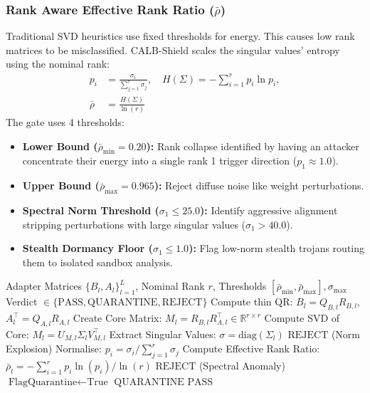 \documentclass[conference]{IEEEtran}
\begin{document}
\subsubsection{Rank Aware Effective Rank Ratio \texorpdfstring{($\bar{\rho}$)}{(rho)}}
Traditional SVD heuristics use fixed thresholds for energy. This causes low rank matrices to be misclassified. CALB-Shield scales the singular values' entropy using the nominal rank:
\begin{align}
p_i &= \frac{\sigma_i}{\sum_{j=1}^r \sigma_j}, \quad H(\Sigma) = -\sum_{i=1}^r p_i \ln p_i, \nonumber \\
\bar{\rho} &= \frac{H(\Sigma)}{\ln(r)}
\end{align}
The gate uses 4 thresholds:
\begin{itemize}
    \item \textbf{Lower Bound ($\bar{\rho}_{\min} = 0.20$):} Rank collapse identified by having an attacker concentrate their energy into a single rank 1 trigger direction ($p_1 \approx 1.0$).
    \item \textbf{Upper Bound ($\bar{\rho}_{\max} = 0.965$):} Reject diffuse noise like weight perturbations.
    \item \textbf{Spectral Norm Threshold ($\sigma_1 \le 25.0$):} Identify aggressive alignment stripping perturbations with large singular values ($\sigma_1 > 40.0$).
    \item \textbf{Stealth Dormancy Floor ($\sigma_1 \le 1.0$):} Flag low-norm stealth trojans routing them to isolated sandbox analysis.
\end{itemize}

\begin{algorithm}[t]
\caption{Fast QR-SVD Spectral Check and Rank Bounds}
\label{alg:qr_svd}
\begin{algorithmic}[1]
\REQUIRE Adapter Matrices $\{B_l, A_l\}_{l=1}^L$, Nominal Rank $r$, Thresholds $[\bar{\rho}_{\min}, \bar{\rho}_{\max}], \sigma_{\max}$
\ENSURE Verdict $\in \{\text{PASS}, \text{QUARANTINE}, \text{REJECT}\}$
    \STATE Compute thin QR: $B_l = Q_{B,l} R_{B,l}$, $A_l^\top = Q_{A,l} R_{A,l}$
    \STATE Create Core Matrix: $M_l = R_{B,l} R_{A,l}^\top \in \mathbb{R}^{r \times r}$
    \STATE Compute SVD of Core: $M_l = U_{M,l} \Sigma_l V_{M,l}^\top$
    \STATE Extract Singular Values: $\sigma = \text{diag}(\Sigma_l)$
        \RETURN $\text{REJECT}$ (Norm Explosion)
    \ENDIF
    \STATE Normalise: $p_i = \sigma_i / \sum_{j=1}^r \sigma_j$
    \STATE Compute Effective Rank Ratio: $\bar{\rho}_l = -\sum_{i=1}^r p_i \ln(p_i) / \ln(r)$
        \RETURN $\text{REJECT}$ (Spectral Anomaly)
    \ENDIF
        \STATE $\text{FlagQuarantine} \leftarrow \text{True}$
    \ENDIF
\ENDFOR
{}
    \RETURN $\text{QUARANTINE}$
\ENDIF
\RETURN $\text{PASS}$
\end{algorithmic}
\end{algorithm}
\end{document}
